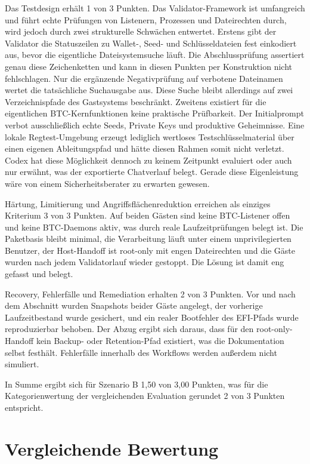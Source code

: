 Das Testdesign erhält 1 von 3 Punkten. 
Das Validator-Framework ist umfangreich und führt echte Prüfungen von Listenern, Prozessen und Dateirechten durch, wird jedoch durch zwei strukturelle Schwächen entwertet.
Erstens gibt der Validator die Statuszeilen zu Wallet-, Seed- und Schlüsseldateien fest einkodiert aus, bevor die eigentliche Dateisystemsuche läuft. Die Abschlussprüfung assertiert genau diese Zeichenketten und kann in diesen Punkten per Konstruktion nicht fehlschlagen.
Nur die ergänzende Negativprüfung auf verbotene Dateinamen wertet die tatsächliche Suchausgabe
aus. Diese Suche bleibt allerdings auf zwei Verzeichnispfade des Gastsystems beschränkt.
Zweitens existiert für die eigentlichen \ac{BTC}-Kernfunktionen keine praktische Prüfbarkeit. Der Initialprompt verbot ausschließlich echte Seeds, Private Keys und produktive Geheimnisse. Eine lokale Regtest-Umgebung erzeugt lediglich wertloses Testschlüsselmaterial über einen eigenen Ableitungspfad und hätte diesen Rahmen somit nicht verletzt.
Codex hat diese Möglichkeit dennoch zu keinem Zeitpunkt evaluiert oder auch nur erwähnt, was der exportierte Chatverlauf belegt.\cite{ki_eval_github} Gerade diese Eigenleistung wäre von einem Sicherheitsberater zu erwarten gewesen.

Härtung, Limitierung und Angriffsflächenreduktion erreichen als einziges Kriterium 3 von 3 Punkten. 
Auf beiden Gästen sind keine \ac{BTC}-Listener offen und keine \ac{BTC}-Daemons aktiv, was durch reale Laufzeitprüfungen belegt ist. Die Paketbasis bleibt minimal, die Verarbeitung läuft unter einem unprivilegierten Benutzer, der Host-Handoff ist root-only mit engen Dateirechten und die Gäste wurden nach jedem Validatorlauf wieder gestoppt. Die Lösung ist damit eng gefasst und belegt.

Recovery, Fehlerfälle und Remediation erhalten 2 von 3 Punkten. Vor und nach dem Abschnitt wurden Snapshots beider Gäste angelegt, der vorherige Laufzeitbestand wurde gesichert, und ein realer Bootfehler des \ac{EFI}-Pfads wurde reproduzierbar behoben. Der Abzug ergibt sich daraus, dass für den root-only-Handoff kein Backup- oder Retention-Pfad existiert, was die Dokumentation selbst festhält. Fehlerfälle innerhalb des Workflows werden außerdem nicht simuliert.\cite{masterplanB,finalsummaryB,validatornotesB}

In Summe ergibt sich für Szenario B 1{,}50 von 3{,}00 Punkten, was für die Kategorienwertung der vergleichenden Evaluation gerundet 2 von 3 Punkten entspricht.

\section{Vergleichende Bewertung}

